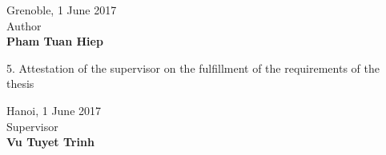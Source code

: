 \begin{flushleft}
{\begin{flushright}
	Grenoble, 1 June 2017\\
	Author \\
	\vspace{1cm}
	\bfseries Pham Tuan Hiep
	\end{flushright}
	\par}
	\vspace{0.5cm}
	{5. Attestation of the supervisor on the fulfillment of the requirements of the thesis \\
	\begin{flushright}
	Hanoi, 1 June 2017\\
	Supervisor\\
	\vspace{1cm}
	\bfseries Vu Tuyet Trinh
	\end{flushright}
	 \par}
	\vspace{0.5cm}
	
\end{flushleft}